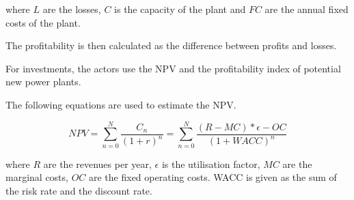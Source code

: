 where $L$ are the losses, $C$ is the capacity of the plant and $FC$ are the annual fixed costs of the plant.

The profitability is then calculated as the difference between profits and losses.

For investments, the actors use the NPV and the profitability index of potential new power plants. 

The following equations are used to estimate the NPV.

\begin{equation}
NPV = \sum_{n=0}^N \frac{C_n}{(1+r)^n} = \sum_{n=0}^{N} \frac{(R-MC)*\epsilon-OC}{(1+WACC)^n}
\end{equation}

where $R$ are the revenues per year, $\epsilon$ is the utilisation factor, $MC$ are the marginal costs, $OC$ are the fixed operating costs. WACC is given as the sum of the risk rate and the discount rate.

